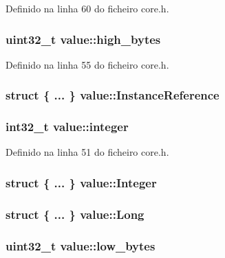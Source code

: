 Definido na linha 60 do ficheiro core.\-h.

\hypertarget{structvalue_a670628f51376fadc6cd3c7aa2076dd95}{
\subsubsection[{high\-\_\-bytes}]{\setlength{\rightskip}{0pt plus 5cm}uint32\-\_\-t value\-::high\-\_\-bytes}}\label{structvalue_a670628f51376fadc6cd3c7aa2076dd95}


Definido na linha 55 do ficheiro core.\-h.

\hypertarget{structvalue_acfcc12390036cb37f60fa22e0900ef8d}{
\subsubsection[{Instance\-Reference}]{\setlength{\rightskip}{0pt plus 5cm}struct \{ ... \}   value\-::\-Instance\-Reference}}\label{structvalue_acfcc12390036cb37f60fa22e0900ef8d}
\hypertarget{structvalue_a58a1dfb88538dd68c4ccd5d6c7f571d2}{
\subsubsection[{integer}]{\setlength{\rightskip}{0pt plus 5cm}int32\-\_\-t value\-::integer}}\label{structvalue_a58a1dfb88538dd68c4ccd5d6c7f571d2}


Definido na linha 51 do ficheiro core.\-h.

\hypertarget{structvalue_a8f62817042c944120cd6099cc5ec9654}{
\subsubsection[{Integer}]{\setlength{\rightskip}{0pt plus 5cm}struct \{ ... \}   value\-::\-Integer}}\label{structvalue_a8f62817042c944120cd6099cc5ec9654}
\hypertarget{structvalue_a525db6e48cfe9e5303f30ba1dde3cb7f}{
\subsubsection[{Long}]{\setlength{\rightskip}{0pt plus 5cm}struct \{ ... \}   value\-::\-Long}}\label{structvalue_a525db6e48cfe9e5303f30ba1dde3cb7f}
\hypertarget{structvalue_a8f7d961af70bd80fe990c31ff3db48fa}{
\subsubsection[{low\-\_\-bytes}]{\setlength{\rightskip}{0pt plus 5cm}uint32\-\_\-t value\-::low\-\_\-bytes}}\label{structvalue_a8f7d961af70bd80fe990c31ff3db48fa}


